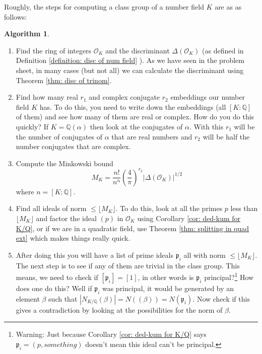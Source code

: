 \documentclass[11pt,a4paper]{report}
\theoremstyle{plain}
\theoremstyle{definition}
\theoremstyle{definition}
\newtheorem{alg}[subsection]{Algorithm}
\def\QQ{\mathbb{Q}}
\def\gothp{\mathfrak{p}}
\def \a{\alpha}
\def \OO {\mathcal{O}}
\begin{document}
	
	
	Roughly, the steps for computing a class group of a number field $K$ are as as follows:
	
	\begin{alg}
		
		
		\begin{enumerate}
			\item Find the ring of integers $\OO_K$ and the discriminant $\Delta(\OO_K)$ (as defined in Definition \ref{definition: disc of num field} ). As we have seen in the problem sheet, in many cases (but not all) we can calculate the discriminant using Theorem \ref{thm: disc of trinom}.
			
			\item Find how many real $r_1$ and complex conjugate $r_2$ embeddings our number field $K$ has. To do this, you need to write down the embeddings (all $[K:\QQ]$ of them) and see how many of them are real or complex. How do you do this quickly? If $K=\QQ(\a)$ then look at the conjugates of $\a$. With this $r_1$ will be the number of conjugates of $\a$  that are real numbers and $r_2$ will be half  the number conjugates that are complex.
			
			\item Compute the Minkowski bound \[M_K= \frac{n!}{n^n} \left( \frac{4}{\pi} \right)^{r_2} |\Delta(\OO_K)|^{1/2}\] where $n=[K:\QQ]$.
			
			
			\item Find all ideals of norm $\leq \lfloor M_K \rfloor$. To do this, look at all the primes $p$ less than $\lfloor M_K \rfloor$ and factor the ideal $(p)$ in $\OO_K$ using Corollary \ref{cor: ded-kum for K/Q}, or if we are in a quadratic field, use Theorem \ref{thm: splitting in quad ext} which makes things really quick.
			
			\item After doing this you will have a list of prime ideals $\gothp_i$ all with norm $\leq \lfloor M_K \rfloor$. The next step is to see if any of them are trivial in the class group. This means, we need to check if $[\gothp_i]=[1]$, in other words is $\gothp_i$ principal?\footnote{Warning: Just because Corollary \ref{cor: ded-kum for K/Q} says $\gothp_i=(p,something)$ doesn't mean this ideal can't be principal.} How does one do this? Well if $\gothp_i$ was principal, it would be generated by an element $\beta$ such that $|N_{K/\QQ}(\beta)|=N((\beta))=N(\gothp_i)$. Now check if this gives a contradiction by looking at the possibilities for the norm of $\beta$.
			

\end{enumerate}
\end{alg}
\end{document}
